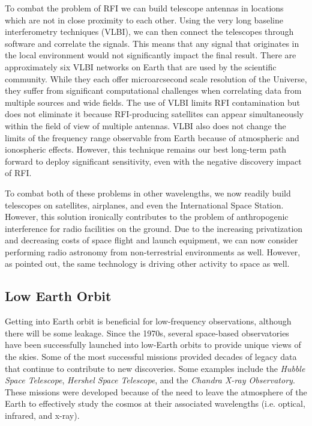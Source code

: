 To combat the problem of RFI we can build telescope antennas in locations which are not in close proximity to each other. Using the very long baseline interferometry techniques (VLBI), we can then connect the telescopes through software and correlate the signals. This means that any signal that originates in the local environment would not significantly impact the final result. There are approximately six VLBI networks on Earth that are used by the scientific community. While they each offer microarcsecond scale resolution of the Universe, they suffer from significant computational challenges when correlating data from multiple sources and wide fields. %
The use of VLBI limits RFI contamination but does not eliminate it because RFI-producing satellites can appear simultaneously within the field of view of multiple antennas. VLBI also does not change the limits of the frequency range observable from Earth because of atmospheric and ionospheric effects.
However, this technique remains our best long-term path forward to deploy significant sensitivity, even with the negative discovery impact of RFI.

To combat both of these problems in other wavelengths, we now readily build telescopes on satellites, airplanes, and even the International Space Station. However, this solution ironically contributes to the problem of anthropogenic interference for radio facilities on the ground. Due to the increasing privatization and decreasing costs of space flight and launch equipment, we can now consider performing radio astronomy from non-terrestrial environments as well.  However, as pointed out, the same technology is driving other activity to space as well.



\subsection{Low Earth Orbit}
Getting into Earth orbit is beneficial for low-frequency observations, although there will be some leakage.
Since the 1970s, several space-based observatories have been successfully launched into low-Earth orbits to provide unique views of the skies. Some of the most successful missions provided decades of legacy data that continue to contribute to new discoveries. Some examples include the \textit{Hubble Space Telescope}, \textit{Hershel Space Telescope}, and the \textit{Chandra X-ray Observatory}. These missions were developed because of the need to leave the atmosphere of the Earth to effectively study the cosmos at their associated wavelengths (i.e. optical, infrared, and x-ray). 

